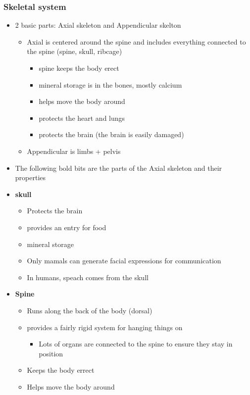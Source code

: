 \documentclass{article}
\theoremstyle{definition}
\begin{document}
\subsubsection{Skeletal system}
\begin{itemize}
	\item 2 basic parts: Axial skeleton and Appendicular skelton
		\begin{itemize}
			\item Axial is centered around the spine and includes everything connected to the spine (spine, skull, ribcage)
				\begin{itemize}
					\item spine keeps the body erect
					\item mineral storage is in the bones, mostly calcium
					\item helps move the body around
					\item protects the heart and lungs
					\item protects the brain (the brain is easily damaged)
				\end{itemize}
			\item Appendicular is limbs + pelvis
		\end{itemize}
	\item The following bold bits are the parts of the Axial skeleton and their properties
	\item \textbf{skull}
		\begin{itemize}
			\item Protects the brain
			\item provides an entry for food
			\item mineral storage
			\item Only mamals can generate facial expressions for communication
			\item In humans, speach comes from the skull
		\end{itemize}
	\item \textbf{Spine} 
		\begin{itemize}
			\item Runs along the back of the body (dorsal)
			\item provides a fairly rigid system for hanging things on
				\begin{itemize}
					\item Lots of organs are connected to the spine to ensure they stay in position
				\end{itemize}
			\item Keeps the body errect
			\item Helps move the body around

\end{itemize}
\end{itemize}
\end{document}

